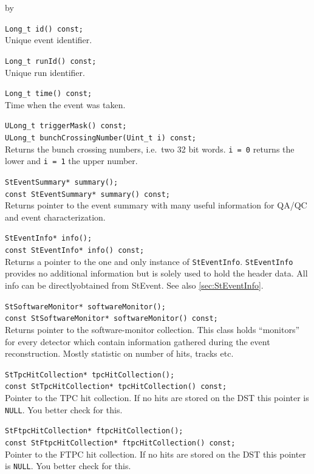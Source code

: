 \documentclass[twoside]{article}
\newcommand{\entrylabel}[1]{\mbox{\textbf{{#1}}}\hfil}%
\newenvironment{entry}
{\begin{list}{}%
    {\renewcommand{\makelabel}{\entrylabel}%
     \setlength{\labelwidth}{90pt}%
     \setlength{\leftmargin}{\labelwidth}
     \advance\leftmargin by \labelsep%
      }%
    }%
  {\end{list}}
\newcommand{\Entrylabel}[1]%
{\raisebox{0pt}[1ex][0pt]{\makebox[\labelwidth][l]%
    {\parbox[t]{\labelwidth}{\hspace{0pt}\textbf{{#1}}}}}}
\newenvironment{Entry}%
{\renewcommand{\entrylabel}{\Entrylabel}\begin{entry}}%
  {\end{entry}}
\begin{document}
\begin{Entry}
    \verb+Long_t id() const;+\\
    Unique event identifier.
    
    \verb+Long_t runId() const;+\\
    Unique run identifier.
    
    \verb+Long_t time() const;+\\
    Time when the event was taken.
    
    \verb+ULong_t triggerMask() const;+\\

    \verb+ULong_t bunchCrossingNumber(Uint_t i) const;+\\       
    Returns the bunch crossing numbers, i.e.~two 32 bit words.
    \texttt{i = 0} returns the lower and \texttt{i = 1} the upper number.

    \verb+StEventSummary* summary();+\\
    \verb+const StEventSummary* summary() const;+\\
    Returns pointer to the event summary with many useful information
    for QA/QC and event characterization.

    \verb+StEventInfo* info();+\\
    \verb+const StEventInfo* info() const;+\\
    Returns a pointer to the one and only instance of \texttt{StEventInfo}.
    \texttt{StEventInfo} provides no additional information but is solely
    used to hold the header data. All info can be directlyobtained  from
    StEvent. See also \ref{sec:StEventInfo}.

    \verb+StSoftwareMonitor* softwareMonitor();+\\
    \verb+const StSoftwareMonitor* softwareMonitor() const;+\\
    Returns pointer to the software-monitor collection. This class
    holds ``monitors'' for every detector which contain information
    gathered during the event reconstruction. Mostly statistic on
    number of hits, tracks etc.
    
    \verb+StTpcHitCollection* tpcHitCollection();+\\
    \verb+const StTpcHitCollection* tpcHitCollection() const;+\\
    Pointer to the TPC hit collection. If no hits are stored on the
    DST this pointer is \texttt{NULL}. You better check for this.
    
    \verb+StFtpcHitCollection* ftpcHitCollection();+\\
    \verb+const StFtpcHitCollection* ftpcHitCollection() const;+\\
    Pointer to the FTPC hit collection. If no hits are stored on the
    DST this pointer is \texttt{NULL}. You better check for this.


\end{Entry}
\end{document}
